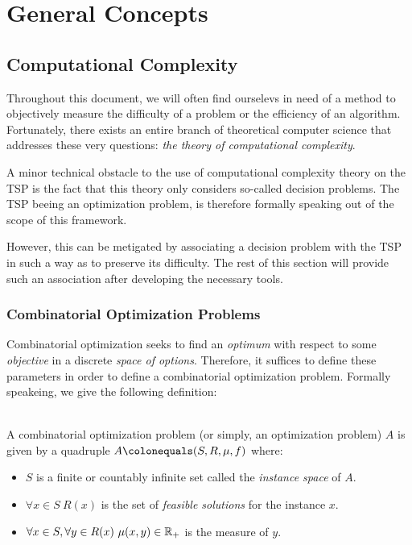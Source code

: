\chapter{General Concepts}


\section{Computational Complexity}

    Throughout this document, we will often find ourselevs in need of a method to objectively measure the difficulty of a problem or the efficiency of an algorithm. Fortunately, there exists an entire branch of theoretical computer science that addresses these very questions: \emph{the theory of computational complexity}.

    A minor technical obstacle to the use of computational complexity theory on the \textsf{TSP} is the fact that this theory only considers so-called decision problems. The \textsf{TSP} beeing an optimization problem, is therefore formally speaking out of the scope of this framework.

    However, this can be metigated by associating a decision problem with the \textsf{TSP} in such a way as to preserve its difficulty. The rest of this section will provide such an association after developing the necessary tools.

    \subsection{Combinatorial Optimization Problems}

        Combinatorial optimization seeks to find an \emph{optimum} with respect to some \emph{objective} in a discrete \emph{space of options}. Therefore, it suffices to define these parameters in order to define a combinatorial optimization problem. Formally speakeing, we give the following definition:

        \begin{definition}\ \\
            A combinatorial optimization problem (or simply, an optimization problem) \(A\) is given by a quadruple \(A \colonequals (S, R, \mu, f)\) where:
            \begin{itemize}
                \item \(S\) is a finite or countably infinite set called the \emph{instance space} of \(A\).
                \item \(\forall x\in S\ R(x)\) is the set of \emph{feasible solutions} for the instance \(x\).
                \item \(\forall x\in S, \forall y \in R(x)\ \mu(x, y)\in\reals_+\) is the measure of \(y\).
            \end{itemize}
        \end{definition}

